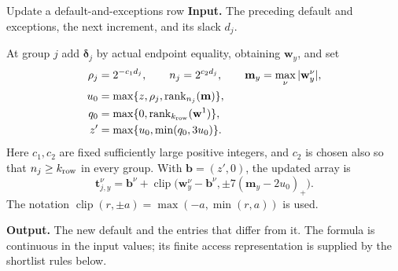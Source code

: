 \documentclass[11pt]{article}
\numberwithin{equation}{section}
\theoremstyle{definition}
\theoremstyle{remark}
\begin{document}
\begin{algorithm}[label=alg:compress-row]{Update a default-and-exceptions row}
\textbf{Input.} The preceding default and exceptions, the next increment, and its slack $d_j$.

At group $j$ add $\boldsymbol{\delta}_j$ by actual endpoint equality, obtaining ${\mathbf{w}}_y$,
and set
\begin{equation}
 \begin{aligned}
 \rho_j&=2^{-c_1d_j},\qquad n_j=2^{c_2d_j},\qquad
 {\mathbf{m}}_y=\max_\nu|{\mathbf{w}}_y^\nu|,\\
 u_0&=\max\{z,\rho_j,\operatorname{rank}_{n_j}({\mathbf m})\},\\
 q_0&=\max\{0,\operatorname{rank}_{k_{\rm row}}({\mathbf w}^1)\},\\
 z'&=\max\{u_0,\min(q_0,3u_0)\}.
 \end{aligned}
 \label{eq:buf-thresholds}
\end{equation}
Here $c_1,c_2$ are fixed sufficiently large positive integers, and
$c_2$ is chosen also so that $n_j\geq {k_{\rm row}}$ in every group.
With $\mathbf b=(z',0)$, the updated array is
\begin{equation}
 {\mathbf{t}}^{\nu}_{j,y}=\mathbf b^\nu+
 \operatorname{clip}\bigl({\mathbf{w}}_y^\nu-\mathbf b^\nu,
                \pm7({\mathbf{m}}_y-2u_0)_+\bigr).
 \label{eq:buf-update}
\end{equation}
The notation $\operatorname{clip}(r,\pm {a})=\max(-{a},\min(r,{a}))$ is used.

\textbf{Output.} The new default and the entries that differ from it. The formula is continuous in the input values; its finite access representation is supplied by the shortlist rules below.
\end{algorithm}
\end{document}
